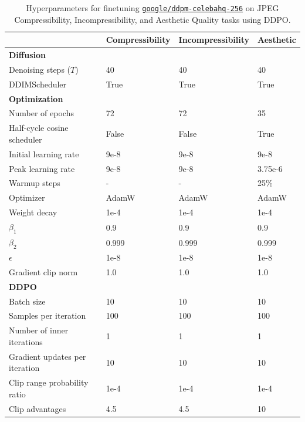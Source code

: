 \begin{appendixs}
    \begin{table}[ht]
        \centering
        \captionsetup{width=\textwidth} %
        \caption{Hyperparameters for finetuning \href{https://huggingface.co/google/ddpm-celebahq-256}{\texttt{\texttt{google/ddpm-celebahq-256}}} on JPEG Compressibility, Incompressibility, and Aesthetic Quality tasks using DDPO.}
        \begin{tabular}{l l l l }
            \textbf{} & \textbf{Compressibility} & \textbf{Incompressibility} & \textbf{Aesthetic} \\
            \hline
            \textbf{Diffusion} & & & \\
            \small{Denoising steps ($T$)} & 40 & 40 & 40 \\
            \small{DDIMScheduler} & True & True & True \\
            \hline
            \textbf{Optimization} & & &  \\
            \small{Number of epochs} & 72 & 72 & 35 \\
            \small{Half-cycle cosine scheduler} & False & False & True \\
            \small{Initial learning rate} & 9e-8 & 9e-8 & 9e-8 \\
            \small{Peak learning rate} & 9e-8 & 9e-8 & 3.75e-6 \\
            \small{Warmup steps} & - & - & 25\% \\
            \small{Optimizer} & AdamW & AdamW & AdamW  \\
            \small{Weight decay} & 1e-4 & 1e-4 & 1e-4\\
            $\beta_1$ & 0.9 & 0.9 & 0.9 \\
            $\beta_2$ & 0.999 & 0.999 & 0.999 \\
            $\epsilon$ & 1e-8 & 1e-8 & 1e-8 \\
            \small{Gradient clip norm} & 1.0 & 1.0 & 1.0 \\
            \hline
            \textbf{DDPO} & & & \\
            \small{Batch size} & 10 & 10 & 10 \\
            \small{Samples per iteration} & 100 & 100 & 100 \\
            \small{Number of inner iterations} & 1 & 1 & 1 \\
            \small{Gradient updates per iteration} & 10 & 10 & 10 \\
            \small{Clip range probability ratio} & 1e-4 & 1e-4 & 1e-4 \\
            \small{Clip advantages} & 4.5 & 4.5 & 10 \\
        \end{tabular}
        \label{tab:Hyperparameters-summary}
    \end{table}


\end{appendixs}

